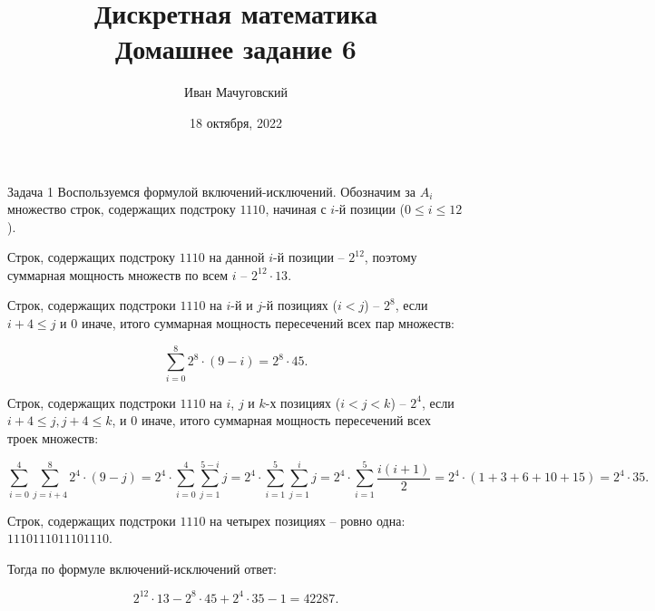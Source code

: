 \documentclass{article}
\date{18 октября, 2022}
\title{Дискретная математика \\ \Large Домашнее задание 6}
\author{Иван Мачуговский}
\begin{document}
	\maketitle

	\begin{section}{Задача 1}
		Воспользуемся формулой включений-исключений. Обозначим за $A_i$ множество строк, содержащих подстроку $1110$, начиная с $i$-й позиции ($0 \le i \le 12$).

		Строк, содержащих подстроку $1110$ на данной $i$-й позиции -- $2^{12}$, поэтому суммарная мощность множеств по всем $i$ -- $2^{12} \cdot 13$.

		Строк, содержащих подстроки $1110$ на $i$-й и $j$-й позициях ($i < j$) -- $2^8$, если $i + 4 \le j$ и $0$ иначе, итого суммарная мощность пересечений всех пар множеств:

		\begin{equation*}
			\sum_{i=0}^8 2^8 \cdot (9-i) = 2^8 \cdot 45.
		\end{equation*}

		Строк, содержащих подстроки $1110$ на $i$, $j$ и $k$-х позициях ($i < j < k$) -- $2^4$, если $i + 4 \le j, j + 4 \le k$, и $0$ иначе, итого суммарная мощность пересечений всех троек множеств:

		\begin{equation*}
			\sum_{i=0}^4 \sum_{j=i+4}^8 2^4 \cdot (9-j) = 2^4 \cdot \sum_{i=0}^4 \sum_{j=1}^{5-i} j = 2^4 \cdot \sum_{i=1}^5 \sum_{j=1}^i j = 2^4 \cdot \sum_{i=1}^5 \frac{i(i+1)}{2} = 2^4 \cdot (1 + 3 + 6 + 10 + 15) = 2^4 \cdot 35.
		\end{equation*}

		Строк, содержащих подстроки $1110$ на четырех позициях -- ровно одна: $1110111011101110$.

		Тогда по формуле включений-исключений ответ:

		\begin{equation*}
			2^{12} \cdot 13 - 2^8 \cdot 45 + 2^4 \cdot 35 - 1 = 42287.
		\end{equation*}
	\end{section}
\end{document}
